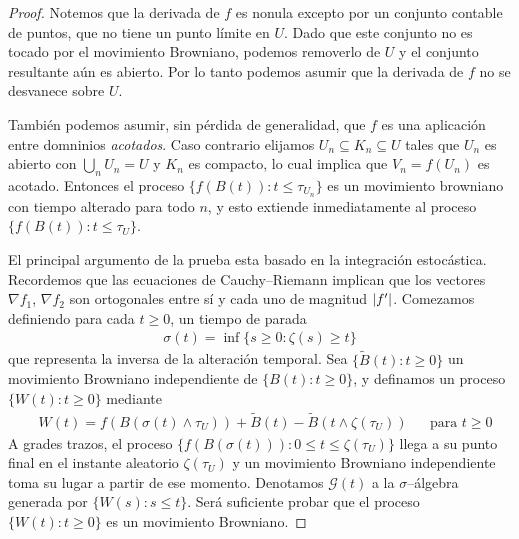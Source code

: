 \documentclass{article}
\DeclarePairedDelimiter{\abs}{\lvert}{\rvert}
\theoremstyle{plain}
\theoremstyle{remark}
\begin{document}
\begin{proof}
  Notemos que la derivada de \(f\) es nonula excepto por un conjunto contable de puntos, que no tiene un punto límite en \(U\).
  Dado que este conjunto no es tocado por el movimiento Browniano, podemos removerlo de \(U\) y el conjunto resultante aún es abierto.
  Por lo tanto podemos asumir que la derivada de \(f\) no se desvanece sobre \(U\).

  También podemos asumir, sin pérdida de generalidad, que \(f\) es una aplicación entre domninios \emph{acotados}.
  Caso contrario elijamos \(U_n \subseteq K_n \subseteq U\) tales que \(U_n\) es abierto con \(\bigcup_n U_n = U\) y \(K_n\) es compacto, lo cual implica que \(V_n = f(U_n)\) es acotado.
  Entonces el proceso \(\{f(B(t)) : t \leq \tau_{U_n}\}\) es un movimiento browniano con tiempo alterado para todo \(n\), y esto extiende inmediatamente al proceso \(\{f(B(t)) : t \leq \tau_U\}\).

  El principal argumento de la prueba esta basado en la integración estocástica.
  Recordemos que las ecuaciones de Cauchy--Riemann implican que los vectores \(\nabla f_1\), \(\nabla f_2\) son ortogonales entre sí y cada uno de magnitud \(\abs{f'}\).
  Comezamos definiendo para cada \(t \geq 0\), un tiempo de parada
  \begin{align}
    \sigma(t) = \inf \{s \geq 0 : \zeta(s) \geq t\}
  \end{align}
  que representa la inversa de la alteración temporal.
  Sea \(\{\widetilde{B}(t) : t \geq 0\}\) un movimiento Browniano independiente de \(\{B(t) : t \geq 0\}\), y definamos un proceso \(\{W(t) : t \geq 0\}\) mediante
  \begin{align}
    &W(t)
    =
    f(B(\sigma(t) \wedge \tau_U))
      + \widetilde{B}(t) - \widetilde{B}(t \wedge \zeta(\tau_U))
    &&\text{para } t \geq 0
  \end{align}
  A grades trazos, el proceso \(\{f(B(\sigma(t))) : 0 \leq t \leq \zeta(\tau_U)\}\) llega a su punto final en el instante aleatorio \(\zeta(\tau_U)\) y un movimiento Browniano independiente toma su lugar a partir de ese momento.
  Denotamos \(\mathcal{G}(t)\) a la \(\sigma\)--álgebra generada por \(\{W(s) : s \leq t\}\).
  Será suficiente probar que el proceso \(\{W(t) : t \geq 0\}\) es un movimiento Browniano.
  

\end{proof}
\end{document}
